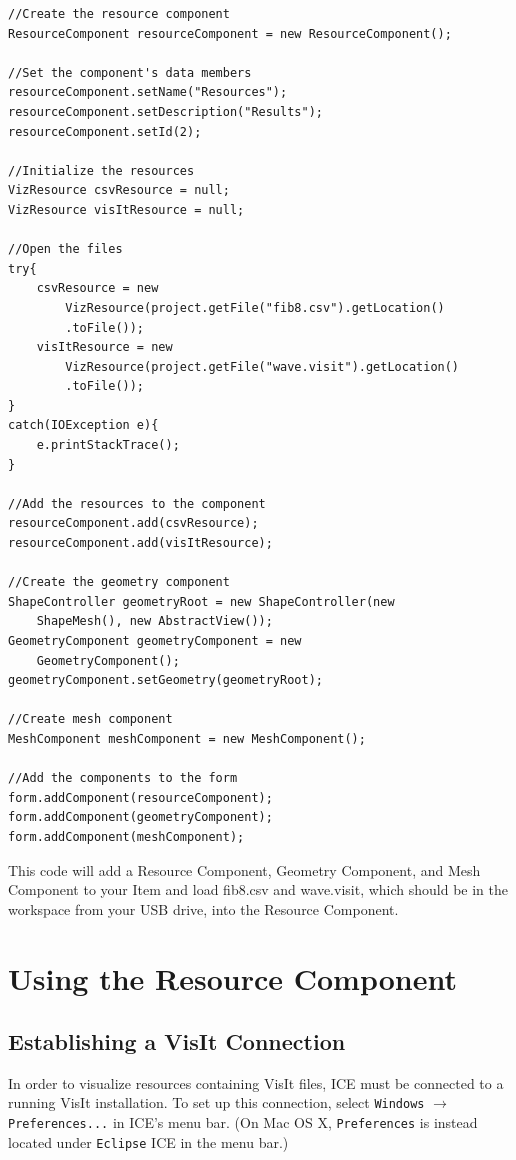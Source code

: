 \documentclass{article}
\begin{document}
\begin{verbatim}
//Create the resource component
ResourceComponent resourceComponent = new ResourceComponent();

//Set the component's data members
resourceComponent.setName("Resources");
resourceComponent.setDescription("Results");
resourceComponent.setId(2);

//Initialize the resources
VizResource csvResource = null;
VizResource visItResource = null;

//Open the files
try{
    csvResource = new 
        VizResource(project.getFile("fib8.csv").getLocation()
        .toFile());
    visItResource = new 
        VizResource(project.getFile("wave.visit").getLocation()
        .toFile());
}
catch(IOException e){
    e.printStackTrace();
}
	
//Add the resources to the component
resourceComponent.add(csvResource);
resourceComponent.add(visItResource);

//Create the geometry component
ShapeController geometryRoot = new ShapeController(new
    ShapeMesh(), new AbstractView());
GeometryComponent geometryComponent = new 
    GeometryComponent();
geometryComponent.setGeometry(geometryRoot);

//Create mesh component
MeshComponent meshComponent = new MeshComponent();

//Add the components to the form
form.addComponent(resourceComponent);
form.addComponent(geometryComponent);
form.addComponent(meshComponent);	
\end{verbatim}

This code will add a Resource Component, Geometry Component, and Mesh Component
to your Item and load fib8.csv and wave.visit, which should be in the workspace
from your USB drive, into the Resource Component.


\section{Using the Resource Component}

\subsection{Establishing a VisIt Connection}

In order to visualize resources containing VisIt files, ICE must be connected to
a running VisIt installation. To set up this connection, select \texttt{Windows}
$\rightarrow$ \texttt{Preferences...} in ICE's menu bar. (On Mac OS X,
\texttt{Preferences} is instead located under \texttt{Eclipse} ICE in the menu
bar.)
\end{document}
